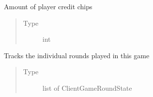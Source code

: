 \documentclass[letterpaper,10pt,english]{sphinxmanual}
\begin{document}
\begin{fulllineitems}
\begin{fulllineitems}
\end{fulllineitems}


\begin{fulllineitems}
\label{\detokenize{client:client.state.ClientGameState._player_bank}}
\pysigstartsignatures
{}
\pysigstopsignatures
\sphinxAtStartPar
Amount of player credit chips
\begin{quote}\begin{description}
\item[{Type}] \leavevmode
\sphinxAtStartPar
int

\end{description}\end{quote}

\end{fulllineitems}


\begin{fulllineitems}
\label{\detokenize{client:client.state.ClientGameState._rounds}}
\pysigstartsignatures
{}
\pysigstopsignatures
\sphinxAtStartPar
Tracks the individual rounds played in this game
\begin{quote}\begin{description}
\item[{Type}] \leavevmode
\sphinxAtStartPar
list of ClientGameRoundState

\end{description}\end{quote}

\end{fulllineitems}


\begin{fulllineitems}
\label{\detokenize{client:client.state.ClientGameState.get_coordinator_id}}
\pysigstartsignatures
{}
\pysigstopsignatures
\end{fulllineitems}


\end{fulllineitems}
\end{document}
